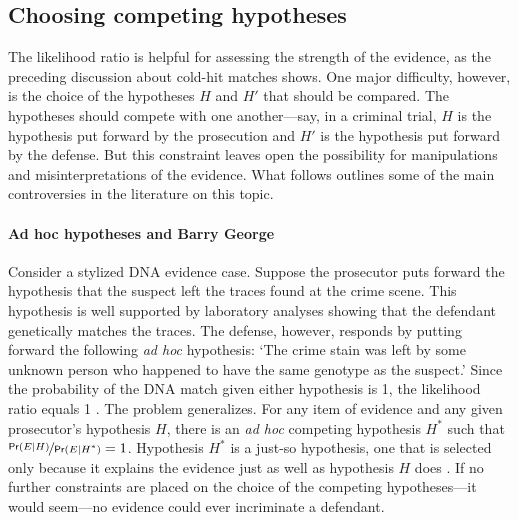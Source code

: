 \documentclass{article}
\newcommand{\pr}{\mathsf{Pr}}
\begin{document}
\subsection{Choosing competing hypotheses}
 \label{subsec:chose-h}
 
The likelihood ratio is helpful for assessing the strength of the evidence, as the preceding discussion about cold-hit matches shows. 
One major difficulty, however,  is the choice of  the hypotheses $H$ and $H'$ that should be compared. The hypotheses should compete with one another---say, in a criminal trial, $H$ is the hypothesis put forward by the prosecution and $H'$ is the hypothesis put forward by the defense. %
But this constraint leaves open the possibility for manipulations and misinterpretations of the evidence. What follows outlines some of the main controversies in the literature on this topic. 



\paragraph{Ad hoc hypotheses and Barry George}

Consider a stylized DNA evidence case. Suppose the prosecutor puts forward the hypothesis that the suspect left the traces found at the crime scene. This hypothesis is well supported by laboratory analyses showing that the defendant genetically matches the traces. 
The defense, however, responds by putting forward the following \textit{ad hoc} hypothesis:  `The crime stain was left by some unknown person who happened to have the same genotype as the suspect.' Since the probability of the DNA match given either hypothesis is 1, the likelihood ratio equals 1 \citep{evett2000MoreHierarchyPropositions}. The problem generalizes. For any item of evidence and any given prosecutor's hypothesis $H$, there is an \textit{ad hoc} competing hypothesis $H^*$ such that $\nicefrac{\pr(E \vert H)}{\pr(E \vert H^*)}=1$.
Hypothesis $H^*$ is a just-so hypothesis, one that is selected only because it explains the evidence just as well as hypothesis $H$ does \citep{mayo2018}. 
%
If no further constraints are placed on the choice of the competing hypotheses---it would seem---no evidence could ever  incriminate a defendant. %
\end{document}
